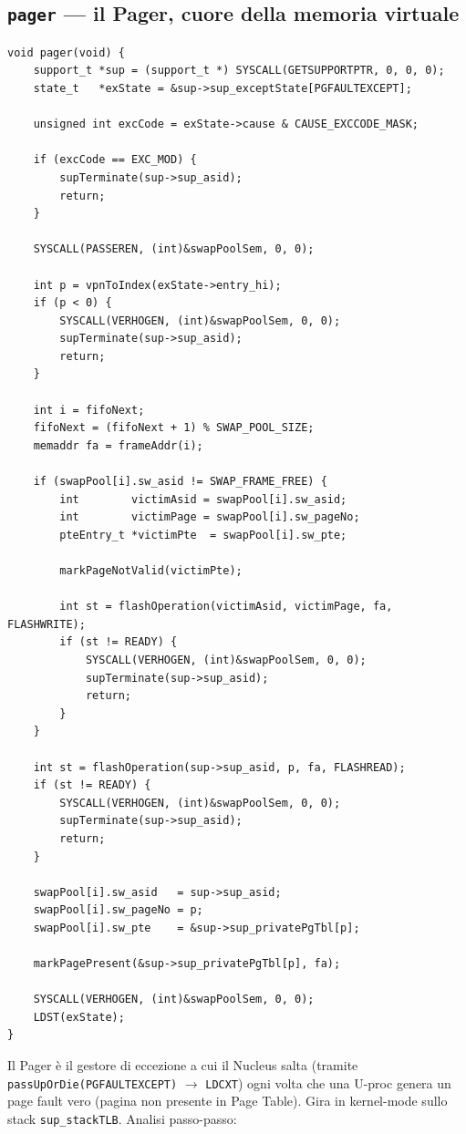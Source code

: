 \documentclass[11pt,a4paper]{article}
\newcommand{\code}[1]{\texttt{#1}}
\newcommand{\func}[1]{\textbf{\texttt{#1}}}
\begin{document}
\subsection{\func{pager} --- il Pager, cuore della memoria virtuale}
\label{sub:pager-fase3}
\begin{lstlisting}
void pager(void) {
    support_t *sup = (support_t *) SYSCALL(GETSUPPORTPTR, 0, 0, 0);
    state_t   *exState = &sup->sup_exceptState[PGFAULTEXCEPT];

    unsigned int excCode = exState->cause & CAUSE_EXCCODE_MASK;

    if (excCode == EXC_MOD) {
        supTerminate(sup->sup_asid);
        return;
    }

    SYSCALL(PASSEREN, (int)&swapPoolSem, 0, 0);

    int p = vpnToIndex(exState->entry_hi);
    if (p < 0) {
        SYSCALL(VERHOGEN, (int)&swapPoolSem, 0, 0);
        supTerminate(sup->sup_asid);
        return;
    }

    int i = fifoNext;
    fifoNext = (fifoNext + 1) % SWAP_POOL_SIZE;
    memaddr fa = frameAddr(i);

    if (swapPool[i].sw_asid != SWAP_FRAME_FREE) {
        int        victimAsid = swapPool[i].sw_asid;
        int        victimPage = swapPool[i].sw_pageNo;
        pteEntry_t *victimPte  = swapPool[i].sw_pte;

        markPageNotValid(victimPte);

        int st = flashOperation(victimAsid, victimPage, fa, FLASHWRITE);
        if (st != READY) {
            SYSCALL(VERHOGEN, (int)&swapPoolSem, 0, 0);
            supTerminate(sup->sup_asid);
            return;
        }
    }

    int st = flashOperation(sup->sup_asid, p, fa, FLASHREAD);
    if (st != READY) {
        SYSCALL(VERHOGEN, (int)&swapPoolSem, 0, 0);
        supTerminate(sup->sup_asid);
        return;
    }

    swapPool[i].sw_asid   = sup->sup_asid;
    swapPool[i].sw_pageNo = p;
    swapPool[i].sw_pte    = &sup->sup_privatePgTbl[p];

    markPagePresent(&sup->sup_privatePgTbl[p], fa);

    SYSCALL(VERHOGEN, (int)&swapPoolSem, 0, 0);
    LDST(exState);
}
\end{lstlisting}

Il Pager è il gestore di eccezione a cui il Nucleus salta (tramite
\code{passUpOrDie(PGFAULTEXCEPT)} $\to$ \code{LDCXT}) ogni volta che una
U-proc genera un page fault vero (pagina non presente in Page Table). Gira
in kernel-mode sullo stack \code{sup\_stackTLB}. Analisi passo-passo:
\end{document}
